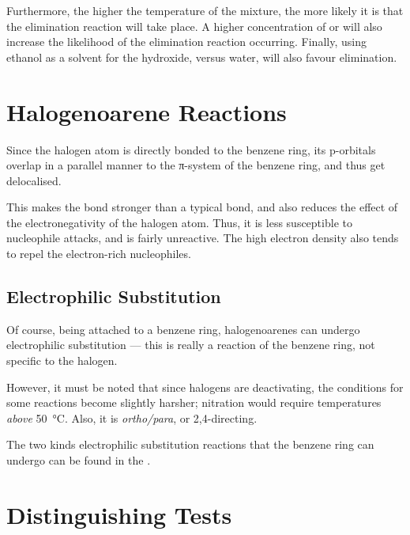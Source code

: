 			Furthermore, the higher the temperature of the mixture, the more likely it is that the elimination reaction will take place.
			A higher concentration of  or  will also increase the likelihood of the elimination reaction occurring.
			Finally, using ethanol as a solvent for the hydroxide, versus water, will also favour elimination.



	\pagebreak
	\section{Halogenoarene Reactions}

		Since the halogen atom is directly bonded to the benzene ring, its p-orbitals overlap in a parallel manner to the π-system of the
		benzene ring, and thus get delocalised.


		This makes the bond stronger than a typical  bond, and also reduces the effect of the electronegativity of the halogen atom.
		Thus, it is less susceptible to nucleophile attacks, and is fairly unreactive. The high electron density also tends to repel the
		electron-rich nucleophiles.


		\subsection{Electrophilic Substitution}

			Of course, being attached to a benzene ring, halogenoarenes can undergo electrophilic substitution --- this is really a reaction
			of the benzene ring, not specific to the halogen.

			However, it must be noted that since halogens are deactivating, the conditions for some reactions become slightly harsher;
			nitration would require temperatures \textit{above} \SI{50}{\celsius}. Also, it is \textit{ortho/para}, or 2,4-directing.

			The two kinds electrophilic substitution reactions that the benzene ring can undergo can be found in the
			\hyperlink{AreneReactions}{}.



	\pagebreak
	\section{Distinguishing Tests}

